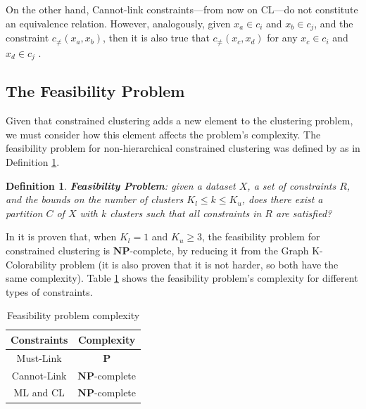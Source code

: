 \documentclass[review]{elsarticle}
\newtheorem{definition}{Definition}
\begin{document}
On the other hand, Cannot-link constraints---from now on CL---do not constitute an equivalence relation. However, analogously, given $x_a \in c_i$ and $x_b \in c_j$, and the constraint $c_{\neq}(x_a,x_b)$, then it is also true that $c_{\neq}(x_c,x_d)$ for any $x_c \in c_i$ and $x_d \in c_j$ \cite{davidson2007survey}.

\subsection{The Feasibility Problem} \label{sec:feas}

Given that constrained clustering adds a new element to the clustering problem, we must consider how this element affects the problem's complexity. The feasibility problem for non-hierarchical constrained clustering was defined by \cite{davidson2005clustering} as in Definition \ref{def1}.

\begin{definition}
	
	\textbf{Feasibility Problem}: given a dataset $X$, a set of constraints $R$, and the bounds on the number of clusters $K_l \leq k \leq K_u$, does there exist a partition $C$ of $X$ with $k$ clusters such that all constraints in $R$ are satisfied? \cite{davidson2007survey}\cite{davidson2005clustering}
	\label{def1}
	
\end{definition}

In \cite{davidson2005clustering} it is proven that, when $K_l = 1$ and $K_u \ge 3$, the feasibility problem for constrained clustering is $\mathbf{NP}$-complete, by reducing it from the Graph K-Colorability problem (it is also proven that it is not harder, so both have the same complexity). Table \ref{tab:feasibility} shows the feasibility problem's complexity for different types of constraints.

\begin{table}[!h]
	\centering
	\setlength{\tabcolsep}{7pt}
	\renewcommand{\arraystretch}{1.2}
		\begin{tabular}{c c}
			\hline
			Constraints & Complexity \\
			\hline
			Must-Link & $\mathbf{P}$\\
			Cannot-Link & $\mathbf{NP}$-complete\\
			ML and CL & $\mathbf{NP}$-complete\\
			\hline
			
		\end{tabular}%
	\caption{Feasibility problem complexity \cite{davidson2005clustering}}
	\label{tab:feasibility}
\end{table}
\end{document}
